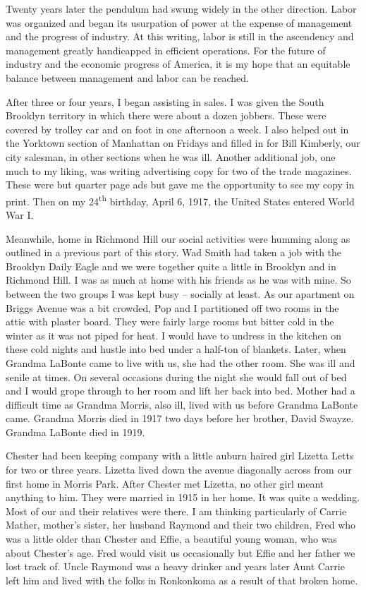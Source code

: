 \documentclass[12pt]{book}              %
\begin{document}
Twenty years later the pendulum had swung widely in the other direction. Labor was organized and began its usurpation of power at the expense of management and the progress of industry. At this writing, labor is still in the ascendency and management greatly handicapped in efficient operations. For the future of industry and the economic progress of America, it is my hope that an equitable balance between management and labor can be reached. 

After three or four years, I began assisting in sales. I was given the South Brooklyn territory in which there were about a dozen jobbers. These were covered by trolley car and on foot in one afternoon a week. I also helped out in the Yorktown section of Manhattan on Fridays and filled in for Bill Kimberly, our city salesman, in other sections when he was ill. Another additional job, one much to my liking, was writing advertising copy for two of the trade magazines. These were but quarter page ads but gave me the opportunity to see my copy in print. Then on my 24\textsuperscript{th} birthday, April 6, 1917, the United States entered World War I.


Meanwhile, home in Richmond Hill our social activities were humming along as outlined in a previous part of this story. Wad Smith had taken a job with the Brooklyn Daily Eagle and we were together quite a little in Brooklyn and in Richmond Hill. I was as much at home with his friends as he was with mine. So between the two groups I was kept busy -- socially at least. As our apartment on Briggs Avenue was a bit crowded, Pop and I partitioned off two rooms in the attic with plaster board. They were fairly large rooms but bitter cold in the winter as it was not piped for heat. I would have to undress in the kitchen on these cold nights and hustle into bed under a half-ton of blankets. Later, when Grandma LaBonte came to live with us, she had the other room. She was ill and senile at times. On several occasions during the night she would fall out of bed and I would grope through to her room and lift her back into bed. Mother had a difficult time as Grandma Morris, also ill, lived with us before Grandma LaBonte came. Grandma Morris died in 1917 two days before her brother, David Swayze. Grandma LaBonte died in 1919. 

Chester had been keeping company with a little auburn haired girl Lizetta Letts for two or three years. Lizetta lived down the avenue diagonally across from our first home in Morris Park. After Chester met Lizetta, no other girl meant anything to him. They were married in 1915 in her home. It was quite a wedding. Most of our and their relatives were there. I am thinking particularly of Carrie Mather, mother's sister, her husband Raymond and their two children, Fred who was a little older than Chester and Effie, a beautiful young woman, who was about Chester's age. Fred would visit us occasionally but Effie and her father we lost track of. Uncle Raymond was a heavy drinker and years later Aunt Carrie left him and lived with the folks in Ronkonkoma as a result of that broken home. 
\end{document}
